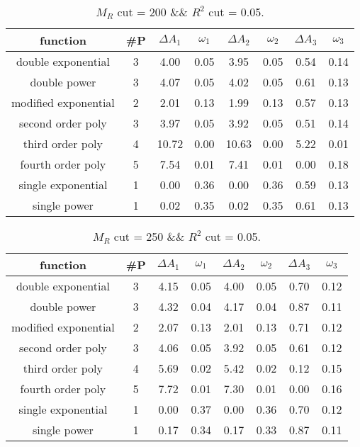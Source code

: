  
\begin{table}[H] 
\begin{center} 
\begin{tabular}{|c|c|cc|cc|cc|} 
\hline function & \#P & $\Delta A_1$ & $\omega_1$ & $\Delta A_2$ & $\omega_2$ & $\Delta A_3$ & $\omega_3$ \\ \hline 
double exponential &  3 &   4.00 &   0.05 &   3.95 &   0.05 &   0.54 &   0.14 \\ 
double power &  3 &   4.07 &   0.05 &   4.02 &   0.05 &   0.61 &   0.13 \\ 
modified exponential &  2 &   2.01 &   0.13 &   1.99 &   0.13 &   0.57 &   0.13 \\ 
second order poly &  3 &   3.97 &   0.05 &   3.92 &   0.05 &   0.51 &   0.14 \\ 
third order poly &  4 &  10.72 &   0.00 &  10.63 &   0.00 &   5.22 &   0.01 \\ 
fourth order poly &  5 &   7.54 &   0.01 &   7.41 &   0.01 &   0.00 &   0.18 \\ 
single exponential &  1 &   0.00 &   0.36 &   0.00 &   0.36 &   0.59 &   0.13 \\ 
single power &  1 &   0.02 &   0.35 &   0.02 &   0.35 &   0.61 &   0.13 \\ 
\hline 
\end{tabular} 
\caption{$M_R$ cut = 200 \&\& $R^2$ cut = 0.05.} 
\label{tab:FitChoices_200_0.05} 
\end{center} 
\end{table} 
 
 
\begin{table}[H] 
\begin{center} 
\begin{tabular}{|c|c|cc|cc|cc|} 
\hline function & \#P & $\Delta A_1$ & $\omega_1$ & $\Delta A_2$ & $\omega_2$ & $\Delta A_3$ & $\omega_3$ \\ \hline 
double exponential &  3 &   4.15 &   0.05 &   4.00 &   0.05 &   0.70 &   0.12 \\ 
double power &  3 &   4.32 &   0.04 &   4.17 &   0.04 &   0.87 &   0.11 \\ 
modified exponential &  2 &   2.07 &   0.13 &   2.01 &   0.13 &   0.71 &   0.12 \\ 
second order poly &  3 &   4.06 &   0.05 &   3.92 &   0.05 &   0.61 &   0.12 \\ 
third order poly &  4 &   5.69 &   0.02 &   5.42 &   0.02 &   0.12 &   0.15 \\ 
fourth order poly &  5 &   7.72 &   0.01 &   7.30 &   0.01 &   0.00 &   0.16 \\ 
single exponential &  1 &   0.00 &   0.37 &   0.00 &   0.36 &   0.70 &   0.12 \\ 
single power &  1 &   0.17 &   0.34 &   0.17 &   0.33 &   0.87 &   0.11 \\ 
\hline 
\end{tabular} 
\caption{$M_R$ cut = 250 \&\& $R^2$ cut = 0.05.} 
\label{tab:FitChoices_250_0.05} 
\end{center} 
\end{table} 
 

